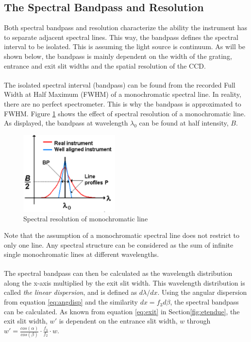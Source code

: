 \subsection{The Spectral Bandpass and Resolution} \label{sec:bp}
Both spectral bandpass and resolution characterize the ability the instrument has to separate adjacent spectral lines. This way, the bandpass defines the spectral interval to be isolated. This is assuming the light source is continuum. As will be shown below, the bandpass is mainly dependent on  the width of the grating, entrance and exit slit widths and the spatial resolution of the CCD. 
\\\\
The isolated spectral interval (bandpass) can be found from the recorded Full Width at Half Maximum (FWHM) of a monochromatic spectral line. In reality, there are no perfect spectrometer. This is why the bandpass is approximated to FWHM. Figure \ref{fig:bp} shows the effect of spectral resolution of a monochromatic line. As displayed, the bandpass at wavelength $\lambda_0$ can be found at half intensity, $B$. 

\begin{figure}[H]
    \centering
    \includegraphics[width=5cm]{Images/theory/bp.png}
    \caption{Spectral resolution of monochromatic line}
    \label{fig:bp}
\end{figure}
\noindent
Note that the assumption of a monochromatic spectral line does not restrict to only one line. Any spectral structure can be considered as the sum of infinite single monochromatic lines at different wavelengths.
\\\\
The spectral bandpass can then be calculated as the wavelength distribution along the x-axis multiplied by the exit slit width. This wavelength distribution is called \textit{the linear dispersion}, and is defined as $d\lambda/dx$. Using the angular dispersion from equation \ref{eq:angdisp} and the similarity $dx = f_3 d\beta$, the spectral bandpass can be calculated. As known from equation \ref{eq:exit} in Section\ref{fig:etendue}, the exit slit width, $w'$ is dependent on the entrance slit width, $w$ through $w' = \frac{cos(\alpha)}{cos(\beta)}\cdot \frac{f_3}{f_2}\cdot w$.

